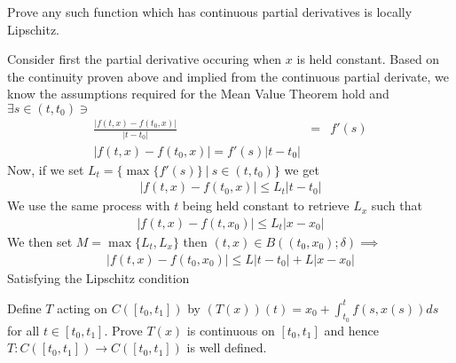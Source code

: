 \documentclass[11pt]{SelfArxOneColBMN}
\begin{document}
\begin{exercise}
Prove any such function which has continuous partial derivatives
is locally Lipschitz.
\end{exercise}

\begin{solution}
Consider first the partial derivative occuring when $x$ is held constant. Based on the continuity proven above and implied from the continuous partial derivate, we know the assumptions required for the Mean Value Theorem hold and $\exists s \in (t,t_0) \ni$
\begin{eqnarray*}
  \frac{|f(t,x) - f(t_0,x)|}{|t - t_0|} &=& f'(s)\\
  |f(t,x) - f(t_0,x)| = f'(s)|t - t_0|
\end{eqnarray*}
Now, if we set $L_t = \{\max\{f'(s)\} \:|\: s \in (t,t_0) \}$ we get
\begin{eqnarray*}
  |f(t,x) - f(t_0,x)| \leq L_t|t - t_0|
\end{eqnarray*}
We use the same process with $t$ being held constant to retrieve $L_x$ such that
\begin{eqnarray*}
  |f(t,x) - f(t,x_0)| \leq L_t|x - x_0|
\end{eqnarray*}
We then set $M = \max\{L_t,L_x\}$ then $(t,x) \in B((t_0,x_0);\delta) \implies$
\begin{eqnarray*}
  |f(t,x) - f(t_0,x_0)| \leq L|t - t_0| + L|x - x_0|
\end{eqnarray*}
Satisfying the Lipschitz condition
\end{solution}

\begin{exercise}
\item Define $T$ acting on $C([t_0,t_1])$ by 
$(T(x))(t) = x_0 + \int_{t_0}^t  f(s,x(s))ds$
for all $t \in [t_0,t_1]$.  Prove $T(x)$ is continuous on $[t_0,t_1]$
and hence $T : C([t_0,t_1]) \rightarrow C([t_0,t_1])$ is well defined.
\end{exercise}
\end{document}
